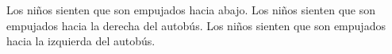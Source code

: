 \begin{multicols}{2}
\begin{parts}
        \begin{choices}
            \choice Los niños sienten que son empujados hacia abajo.
            \choice Los niños sienten que son empujados hacia la derecha del
            autobús.
            \choice Los niños sienten que son empujados hacia la izquierda del
            autobús.
        \end{choices}
    \end{parts}
\end{multicols}